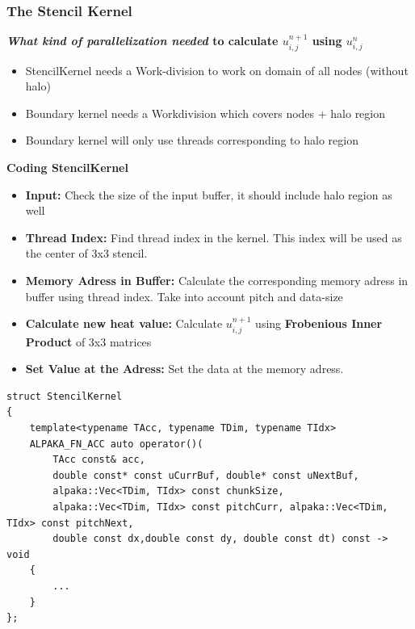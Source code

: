 \documentclass[9pt]{beamer}
\begin{document}
\begin{frame}[fragile]
\frametitle{The Stencil Kernel}
\scriptsize
 \textbf{\textit{What kind of parallelization needed} to calculate  $u_{i,j}^{n+1}$ using $u_{i,j}^{n}$ }


    \begin{itemize}
        \item StencilKernel needs a Work-division to work on domain of all nodes (without halo)
        \item Boundary kernel needs a Workdivision which covers nodes + halo region
        \item Boundary kernel will only use threads corresponding to halo region
    \end{itemize}


\textbf{Coding StencilKernel }


    \begin{itemize}
    \item \textbf{Input:} Check the size of the input buffer, it should include halo region as well
    \item \textbf{Thread Index:} Find thread index in the kernel. This index will be used as the center of 3x3 stencil.
    \item \textbf{Memory Adress in Buffer:} Calculate the corresponding memory adress in buffer using thread index. Take into account pitch and data-size
    \item \textbf{Calculate new heat value:} Calculate $u_{i,j}^{n+1}$ using \textbf{Frobenious Inner Product} of 3x3 matrices
    \item \textbf{Set Value at the Adress:} Set the data at the memory adress.
    \end{itemize}
    \lstset{basicstyle=\ttfamily\tiny}
    \begin{lstlisting}
struct StencilKernel
{
    template<typename TAcc, typename TDim, typename TIdx>
    ALPAKA_FN_ACC auto operator()(
        TAcc const& acc,
        double const* const uCurrBuf, double* const uNextBuf,
        alpaka::Vec<TDim, TIdx> const chunkSize,
        alpaka::Vec<TDim, TIdx> const pitchCurr, alpaka::Vec<TDim, TIdx> const pitchNext,
        double const dx,double const dy, double const dt) const -> void
    {
        ...
    }
};
    \end{lstlisting}
\end{frame}

\end{document}
